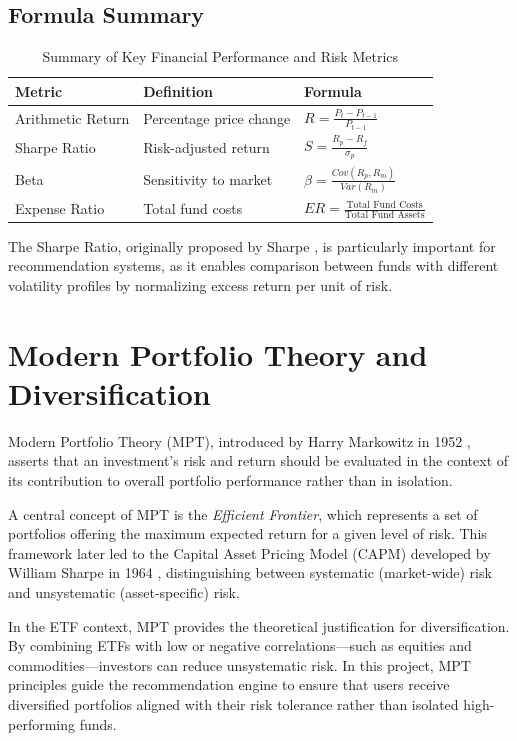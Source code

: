 \subsection{Formula Summary}
\begin{table}[ht]
\centering
\begin{tabular}{lll}
\toprule
\textbf{Metric} & \textbf{Definition} & \textbf{Formula} \\
\midrule
Arithmetic Return & Percentage price change &
$\displaystyle R = \frac{P_t - P_{t-1}}{P_{t-1}}$ \\

Sharpe Ratio & Risk-adjusted return &
$\displaystyle S = \frac{R_p - R_f}{\sigma_p}$ \\

Beta & Sensitivity to market &
$\displaystyle \beta = \frac{Cov(R_p, R_m)}{Var(R_m)}$ \\

Expense Ratio & Total fund costs &
$\displaystyle ER = \frac{\text{Total Fund Costs}}{\text{Total Fund Assets}}$ \\
\bottomrule
\end{tabular}
\caption{Summary of Key Financial Performance and Risk Metrics}
\end{table}


The Sharpe Ratio, originally proposed by Sharpe \cite{sharpe1966}, is particularly important for recommendation systems, as it enables comparison between funds with different volatility profiles by normalizing excess return per unit of risk.

\section{Modern Portfolio Theory and Diversification}

Modern Portfolio Theory (MPT), introduced by Harry Markowitz in 1952 \cite{markowitz1952}, asserts that an investment’s risk and return should be evaluated in the context of its contribution to overall portfolio performance rather than in isolation.

A central concept of MPT is the \textit{Efficient Frontier}, which represents a set of portfolios offering the maximum expected return for a given level of risk. This framework later led to the Capital Asset Pricing Model (CAPM) developed by William Sharpe in 1964 \cite{sharpe1964}, distinguishing between systematic (market-wide) risk and unsystematic (asset-specific) risk.

In the ETF context, MPT provides the theoretical justification for diversification. By combining ETFs with low or negative correlations—such as equities and commodities—investors can reduce unsystematic risk. In this project, MPT principles guide the recommendation engine to ensure that users receive diversified portfolios aligned with their risk tolerance rather than isolated high-performing funds.


